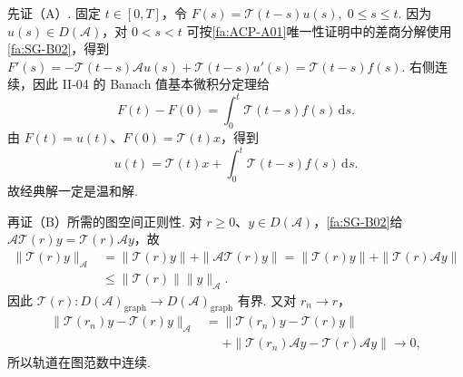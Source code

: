 \begin{FAProof}
先证（A）. 固定 \(\displaystyle t\in[0,T]\)，令 \(\displaystyle F(s)=\mathcal T(t-s)u(s), \; 0\leqslant s\leqslant t.\)
因为 \(\displaystyle u(s)\in D(\mathcal A)\)，对 \(\displaystyle0<s<t\) 可按\autoref{fa:ACP-A01}唯一性证明中的差商分解使用\autoref{fa:SG-B02}，得到 \(\displaystyle F'(s)=-\mathcal T(t-s)\mathcal Au(s)+\mathcal T(t-s)u'(s)=\mathcal T(t-s)f(s).\)
右侧连续，因此 II-04 的 Banach 值基本微积分定理给
\[
F(t)-F(0)
=
\int_0^t\mathcal T(t-s)f(s)\,\mathrm{d}s.
\]
由 \(\displaystyle F(t)=u(t)\)、\(\displaystyle F(0)=\mathcal T(t)x\)，得到
\[
u(t)
=
\mathcal T(t)x
+
\int_0^t\mathcal T(t-s)f(s)\,\mathrm{d}s.
\]
故经典解一定是温和解.

再证（B）所需的图空间正则性. 对 \(\displaystyle r\geqslant0\)、\(\displaystyle y\in D(\mathcal A)\)，\autoref{fa:SG-B02}给 \(\displaystyle\mathcal A\mathcal T(r)y=\mathcal T(r)\mathcal Ay\)，故
\[
\begin{aligned}
\|\mathcal T(r)y\|_{\mathcal A}
&=
\|\mathcal T(r)y\|+\|\mathcal A\mathcal T(r)y\|
=
\|\mathcal T(r)y\|+\|\mathcal T(r)\mathcal Ay\|\\
&\leqslant
\|\mathcal T(r)\|\|y\|_{\mathcal A}.
\end{aligned}
\]
因此 \(\displaystyle\mathcal T(r):D(\mathcal A)_{\mathrm{graph}}\to D(\mathcal A)_{\mathrm{graph}}\) 有界. 又对 \(\displaystyle r_n\to r\)，
\[
\begin{aligned}
\|\mathcal T(r_n)y-\mathcal T(r)y\|_{\mathcal A}
&=
\|\mathcal T(r_n)y-\mathcal T(r)y\|\\
&\mathrel{\phantom{=}}+
\|\mathcal T(r_n)\mathcal Ay-\mathcal T(r)\mathcal Ay\|
\longrightarrow0,
\end{aligned}
\]
所以轨道在图范数中连续.


\end{FAProof}
